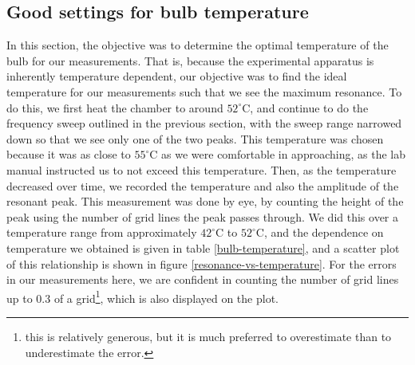\documentclass[10pt]{article}
\begin{document}
	\subsection{Good settings for bulb temperature}
	In this section, the objective was to determine the optimal temperature of the
	bulb for our measurements. That is, because the experimental apparatus is
	inherently temperature dependent, our objective was to find the ideal temperature
	for our measurements such that we see the maximum resonance. To do this, we first
	heat the chamber to around \( 52^{\circ} \)C, and continue to do the frequency
	sweep outlined in the previous section, with the sweep range narrowed down so
	that we see only one of the two peaks. This temperature was chosen because it was
	as close to \( 55^{\circ} \)C as we were comfortable in approaching, as the lab
	manual instructed us to not exceed this temperature. Then, as the temperature
	decreased over time, we recorded the temperature and also the amplitude of the
	resonant peak. This measurement was done by eye, by counting the height of the
	peak using the number of grid lines the peak passes through. We did this over a
	temperature range from approximately \( 42^{\circ} \)C to \( 52^{\circ} \)C, and
	the dependence on temperature we obtained is given in table
	\ref{bulb-temperature}, and a scatter plot of this relationship is shown in
	figure    
	\ref{resonance-vs-temperature}. For the errors in our measurements here, we are
	confident in counting the number of grid lines up to 0.3 of a grid\footnote{this
		is relatively generous, but it is much preferred to overestimate than to
	underestimate the error.}, which is also displayed on the plot.  
\end{document}
